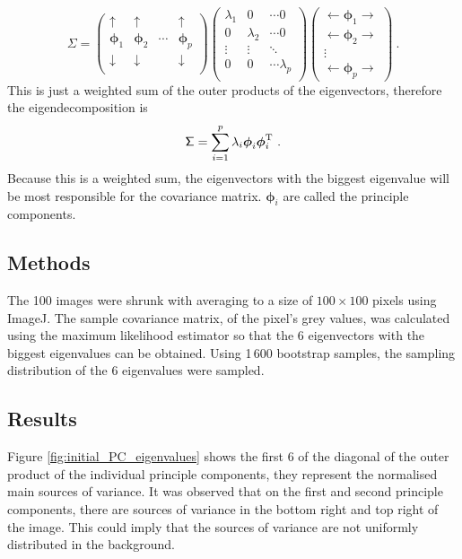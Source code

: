 \documentclass[12pt]{report}
\newcommand{\T}{^\textup{T}}
\newcommand{\vectGreek}[1]{\boldsymbol{#1}}
\newcommand{\matr}[1]{\mathsf{#1}}
\begin{document}
\begin{equation*}
\matr{\Sigma}
=
\begin{pmatrix}
		\uparrow & \uparrow & & \uparrow \\
		\vectGreek{\phi}_1 & \vectGreek{\phi}_2 &\cdots& \vectGreek{\phi}_p \\
		\downarrow & \downarrow & & \downarrow \\
\end{pmatrix}
\begin{pmatrix}
	\lambda_1 & 0 & \cdots 0 \\
	0 & \lambda_2 & \cdots 0 \\
	\vdots & \vdots & \ddots \\
	0 & 0 & \cdots \lambda_p \\
\end{pmatrix}
\begin{pmatrix}
	\leftarrow\vectGreek{\phi}_1\rightarrow \\
	\leftarrow\vectGreek{\phi}_2\rightarrow \\
	\vdots \\
	\leftarrow\vectGreek{\phi}_p\rightarrow
\end{pmatrix} \ .
\end{equation*}
This is just a weighted sum of the outer products of the eigenvectors, therefore the eigendecomposition is
\begin{equation}
\matr{\Sigma} = \sum_{i=1}^{p} \lambda_i \vectGreek{\phi}_i \vectGreek{\phi}_i\T \ .
\end{equation}
Because this is a weighted sum, the eigenvectors with the biggest eigenvalue will be most responsible for the covariance matrix. $\vectGreek{\phi}_i$ are called the principle components.

\subsection{Methods}
The 100 images were shrunk with averaging to a size of $100\times100$ pixels using ImageJ. The sample covariance matrix, of the pixel's grey values, was calculated using the maximum likelihood estimator so that the 6 eigenvectors with the biggest eigenvalues can be obtained. Using 1\,600 bootstrap samples, the sampling distribution of the 6 eigenvalues were sampled.

\subsection{Results}
Figure \ref{fig:initial_PC_eigenvalues} shows the first 6 of the diagonal of the outer product of the individual principle components, they represent the normalised main sources of variance. It was observed that on the first and second principle components, there are sources of variance in the bottom right and top right of the image. This could imply that the sources of variance are not uniformly distributed in the background.
\end{document}

